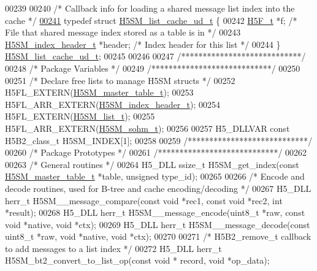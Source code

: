 \begin{DoxyCode}
00239 
00240 \textcolor{comment}{/* Callback info for loading a shared message list index into the cache */}
\hyperlink{struct_h5_s_m__list__cache__ud__t}{00241} \textcolor{keyword}{typedef} \textcolor{keyword}{struct }\hyperlink{struct_h5_s_m__list__cache__ud__t}{H5SM\_list\_cache\_ud\_t} \{
00242     \hyperlink{struct_h5_f__t}{H5F\_t} *f;                   \textcolor{comment}{/* File that shared message index stored as a table is in */}
00243     \hyperlink{struct_h5_s_m__index__header__t}{H5SM\_index\_header\_t} *header; \textcolor{comment}{/* Index header for this list */}
00244 \} \hyperlink{struct_h5_s_m__list__cache__ud__t}{H5SM\_list\_cache\_ud\_t};
00245 
00246 
00247 \textcolor{comment}{/****************************/}
00248 \textcolor{comment}{/* Package Variables        */}
00249 \textcolor{comment}{/****************************/}
00250 
00251 \textcolor{comment}{/* Declare free lists to manage H5SM structs */}
00252 H5FL\_EXTERN(\hyperlink{struct_h5_s_m__master__table__t}{H5SM\_master\_table\_t});
00253 H5FL\_ARR\_EXTERN(\hyperlink{struct_h5_s_m__index__header__t}{H5SM\_index\_header\_t});
00254 H5FL\_EXTERN(\hyperlink{struct_h5_s_m__list__t}{H5SM\_list\_t});
00255 H5FL\_ARR\_EXTERN(\hyperlink{struct_h5_s_m__sohm__t}{H5SM\_sohm\_t});
00256 
00257 H5\_DLLVAR \textcolor{keyword}{const} H5B2\_class\_t H5SM\_INDEX[1];
00258 
00259 \textcolor{comment}{/****************************/}
00260 \textcolor{comment}{/* Package Prototypes       */}
00261 \textcolor{comment}{/****************************/}
00262 
00263 \textcolor{comment}{/* General routines */}
00264 H5\_DLL ssize\_t H5SM\_get\_index(\textcolor{keyword}{const} \hyperlink{struct_h5_s_m__master__table__t}{H5SM\_master\_table\_t} *table, \textcolor{keywordtype}{unsigned} type\_id);
00265 
00266 \textcolor{comment}{/* Encode and decode routines, used for B-tree and cache encoding/decoding */}
00267 H5\_DLL herr\_t H5SM\_\_message\_compare(\textcolor{keyword}{const} \textcolor{keywordtype}{void} *rec1, \textcolor{keyword}{const} \textcolor{keywordtype}{void} *rec2, \textcolor{keywordtype}{int} *result);
00268 H5\_DLL herr\_t H5SM\_\_message\_encode(uint8\_t *raw, \textcolor{keyword}{const} \textcolor{keywordtype}{void} *native, \textcolor{keywordtype}{void} *ctx);
00269 H5\_DLL herr\_t H5SM\_\_message\_decode(\textcolor{keyword}{const} uint8\_t *raw, \textcolor{keywordtype}{void} *native, \textcolor{keywordtype}{void} *ctx);
00270 
00271 \textcolor{comment}{/* H5B2\_remove\_t callback to add messages to a list index */}
00272 H5\_DLL herr\_t H5SM\_bt2\_convert\_to\_list\_op(\textcolor{keyword}{const} \textcolor{keywordtype}{void} * record, \textcolor{keywordtype}{void} *op\_data);

\end{DoxyCode}

